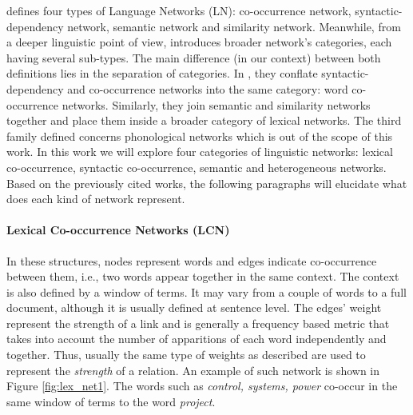 \cite{Mihalcea2011} defines four types of Language Networks (LN): co-occurrence network, syntactic-dependency network, semantic network and similarity network. Meanwhile, from a deeper linguistic point of view, \cite{Choudhury2009} introduces broader network's categories, each having several sub-types. The main difference (in our context) between both definitions lies in the separation of categories. In \cite{Choudhury2009}, they conflate syntactic-dependency and co-occurrence networks into the same  category: word co-occurrence networks. Similarly, they join semantic and similarity networks together and place them inside a broader category of lexical networks. The third  family  defined concerns phonological networks which is out of the scope of this work. In this work we will explore four categories of linguistic networks: lexical co-occurrence, syntactic co-occurrence, semantic and heterogeneous networks. Based  on the previously cited works, the following paragraphs will elucidate what does each kind of network represent.



\paragraph{Lexical Co-occurrence Networks (LCN)}

 In these structures, nodes represent words and edges indicate co-occurrence between them, i.e., two words appear together in the same context. The context is also defined by a window of terms. It may vary from a couple of words to a full document, although it is usually defined at sentence level. The edges' weight  represent the strength of a link and is generally a frequency based metric that takes into account the  number of apparitions of each word independently and together. Thus, usually the same type of weights as described are used to represent the \textit{strength}  of a relation. An example of such network is shown in Figure \ref{fig:lex_net1}. The words such as \textit{control, systems, power} co-occur in the same window of terms to the word \textit{project}.

